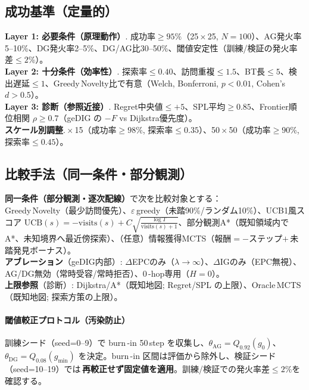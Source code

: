 \documentclass[ja=standard,xelatex]{bxjsarticle}
\begin{document}
\subsection{成功基準（定量的）}\label{sec:maze_success_criteria}
\textbf{Layer 1: 必要条件（原理動作）}.\; 成功率$\ge95\%$（25\,\mbox{$\times$}\,25, $N{=}100$）、AG発火率5--10\%、DG発火率2--5\%、DG/AG比30--50\%、閾値安定性（訓練/検証の発火率差$\le2$\%）。\\
\textbf{Layer 2: 十分条件（効率性）}.\; 探索率$\le0.40$、訪問重複$\le1.5$、BT長$\le5$、検出遅延$\le1$、Greedy\,Novelty比で有意（Welch, Bonferroni, $p{<}0.01$, Cohen's $d{>}0.5$）。\\
\textbf{Layer 3: 診断（参照近接）}.\; Regret中央値$\le {+}5$、SPL平均$\ge0.85$、Frontier順位相関 $\rho\ge0.7$（geDIG の $-F$ vs Dijkstra優先度）。\\
\textbf{スケール別調整}.\,\mbox{$\times$}\,15（成功率$\ge98$\%, 探索率$\le0.35$）、50\,\mbox{$\times$}\,50（成功率$\ge90$\%, 探索率$\le0.45$）。

\subsection{比較手法（同一条件・部分観測）}\label{sec:maze_baselines}
\textbf{同一条件（部分観測・逐次配線）}で次を比較対象とする：\\
Greedy\,Novelty（最少訪問優先）、$\varepsilon$\,greedy（未踏90\%/ランダム10\%）、UCB1風スコア\; $\mathrm{UCB}(s){=}{-}\mathrm{visits}(s){+}C\sqrt{\tfrac{\log T}{\mathrm{visits}(s){+}1}}$、部分観測A*（既知領域内でA*、未知境界へ最近傍探索）、（任意）情報獲得MCTS（報酬$={-}$ステップ$+\,$未踏発見ボーナス）。\\
\textbf{アブレーション}（geDIG内部）: $\Delta$EPCのみ（$\lambda\to\infty$）、$\Delta$IGのみ（EPC無視）、AG/DG無効（常時受容/常時拒否）、0\,\mbox{-}hop専用（$H{=}0$）。\\
\textbf{上限参照}（診断）: Dijkstra/A*（既知地図; Regret/SPL の上限）、Oracle\,MCTS（既知地図; 探索方策の上限）。

\paragraph{閾値較正プロトコル（汚染防止）}\label{sec:threshold_calibration_protocol}
訓練シード（seed=0--9）で burn\,\mbox{-}in 50\,step を収集し、$\theta_{\mathrm{AG}}{=}Q_{0.92}(g_0)$、$\theta_{\mathrm{DG}}{=}Q_{0.08}(g_{\min})$ を決定。burn\,\mbox{-}in 区間は評価から除外し、検証シード（seed=10--19）では\,\textbf{再較正せず固定値を適用}。訓練/検証での発火率差$\le2$\%を確認する。
\end{document}
